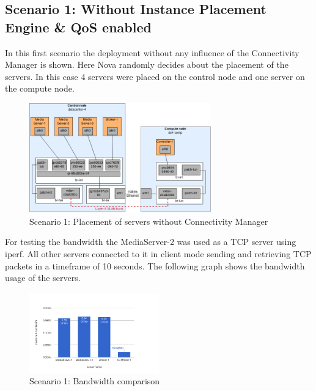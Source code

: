 \subsection{Scenario 1: Without Instance Placement Engine \& QoS enabled}

In this first scenario the deployment without any influence of the Connectivity Manager is shown. Here Nova randomly decides about the placement of the servers. In this case 4 servers were placed on the control node and one server on the compute node.

\begin{figure}[H]
\centering

\includegraphics[width=0.7\textwidth]{images/evaluation/testbed_scenario1}

\caption{Scenario 1: Placement of servers without Connectivity Manager}
\end{figure}

For testing the bandwidth the MediaServer-2 was used as a TCP server using iperf. All other servers connected to it in client mode sending and retrieving TCP packets in a timeframe of 10 seconds. The following graph shows the bandwidth usage of the servers.

\begin{figure}[H]
\centering

\includegraphics[width=0.5\textwidth]{images/evaluation/testbed_scenario1_bw}

\caption{Scenario 1: Bandwidth comparison}
\end{figure}

